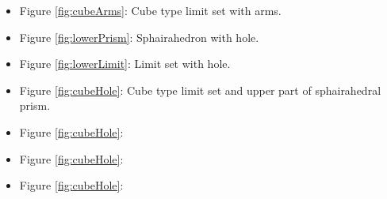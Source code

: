 \documentclass[suppldata, dvipdfmx]{interact}
\theoremstyle{plain}%
\theoremstyle{definition}
\theoremstyle{remark}
\theoremstyle{problemstyle}
\begin{document}
\begin{itemize}
\item Figure \ref{fig:cubeArms}: Cube type limit set with arms.
\item Figure \ref{fig:lowerPrism}: Sphairahedron with hole.
\item Figure \ref{fig:lowerLimit}: Limit set with hole.

\item Figure \ref{fig:cubeHole}: Cube type limit set and upper part of
      sphairahedral prism.
\item Figure \ref{fig:cubeHole}:
\item Figure \ref{fig:cubeHole}:
\item Figure \ref{fig:cubeHole}:
\end{itemize}
\end{document}
